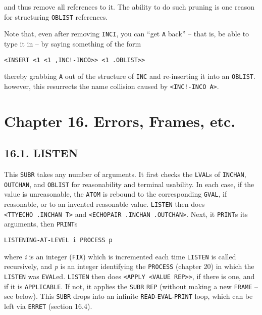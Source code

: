 \documentclass[a4paper,]{article}
\begin{document}
and thus remove all references to it. The ability to do such pruning is one reason for structuring \texttt{OBLIST}
references.

Note that, even after removing \texttt{INCI}, you can ``get \texttt{A} back'' -- that is, be able to type it in -- by
saying something of the form

\begin{verbatim}
<INSERT <1 <1 ,INC!-INCO>> <1 .OBLIST>>
\end{verbatim}

thereby grabbing \texttt{A} out of the structure of \texttt{INC} and re-inserting it into an \texttt{OBLIST}. however, this
resurrects the name collision caused by \texttt{\textless{}INC!-INCO\ A\textgreater{}}.

\section{Chapter 16. Errors, Frames, etc.}\label{chapter-16.-errors-frames-etc.}

\subsection{16.1. LISTEN}\label{listen}

This \texttt{SUBR} takes any number of arguments. It first checks the \texttt{LVAL}s of
\texttt{INCHAN}, \texttt{OUTCHAN}, and
\texttt{OBLIST} for reasonability and terminal usability. In each case, if the value is
unreasonable, the \texttt{ATOM} is rebound to the corresponding \texttt{GVAL}, if reasonable, or to an invented reasonable
value. \texttt{LISTEN} then does
\texttt{\textless{}TTYECHO\ .INCHAN\ T\textgreater{}} and
\texttt{\textless{}ECHOPAIR\ .INCHAN\ .OUTCHAN\textgreater{}}. Next, it \texttt{PRINT}s its
arguments, then \texttt{PRINT}s

\begin{verbatim}
LISTENING-AT-LEVEL i PROCESS p
\end{verbatim}

where \emph{i} is an integer (\texttt{FIX}) which is incremented each time \texttt{LISTEN} is called recursively, and
\emph{p} is an integer identifying the \texttt{PROCESS} (chapter 20) in which the \texttt{LISTEN}
was \texttt{EVAL}ed. \texttt{LISTEN} then does
\texttt{\textless{}APPLY\ \textless{}VALUE\ REP\textgreater{}\textgreater{}}, if there is one, and if it is
\texttt{APPLICABLE}. If not, it applies the \texttt{SUBR} \texttt{REP} (without making a new
\texttt{FRAME} -- see below). This \texttt{SUBR} drops into an infinite \texttt{READ}-\texttt{EVAL}-\texttt{PRINT} loop,
which can be left via \texttt{ERRET} (section 16.4).
\end{document}
